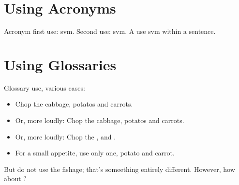 \documentclass{article}
\begin{document}
\section{Using Acronyms}
Acronym first use: \gls{svm}. Second use: \gls{svm}. A use \gls{svm} within a sentence.

\section{Using Glossaries}
Glossary use, various cases:
\begin{itemize}
\item Chop the \gls{cabbage}, \glspl{potato} and \glspl{carrot}.
\item Or, more loudly: Chop the \Gls{cabbage}, \Glspl{potato} and \Glspl{carrot}.
\item Or, more loudly: Chop the ,  and .
\item For a small appetite, use only one, \gls{potato} and \gls{carrot}.
\end{itemize}
But do not use the \gls{fishage}; that's someething entirely different.
However, how about ?

\printnoidxglossaries
\end{document}
